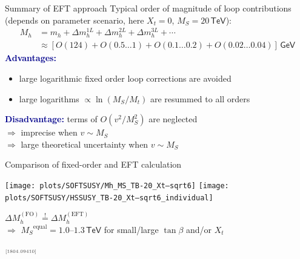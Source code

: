 \documentclass[hyperref={pdfpagelabels=false},ngerman]{beamer}
\newcommand{\eh}[1]{\,\mathsf{#1}}
\newcommand{\MS}{\ensuremath{M_S}}
\newcommand{\mycite}[1]{\ensuremath{\text{\textcolor{darkgray}{\tiny [#1]}}}}
\renewcommand{\emph}[1]{\textbf{\textcolor{darkblue}{#1}}}
\newcommand{\TeV}{\eh{TeV}}
\newcommand{\DMhFO}{\ensuremath{\Delta M_h^{(\text{FO})}}}
\newcommand{\DMhEFT}{\ensuremath{\Delta M_h^{(\text{EFT})}}}
\begin{document}
\begin{frame}{Summary of EFT approach}
  Typical order of magnitude of loop contributions (depends on
  parameter scenario, here $X_t = 0$, $\MS = 20\eh{TeV}$):
  \begin{align*}
    M_h &= m_h + \Delta m_h^{1L} + \Delta m_h^{2L} + \Delta m_h^{3L} + \cdots \\
    &\approx [O(124) + O(0.5\ldots 1) + O(0.1\ldots 0.2) + O(0.02\ldots 0.04)] \eh{GeV}
  \end{align*}
  \emph{Advantages:}
  \begin{itemize}
  \item large logarithmic fixed order loop corrections are avoided
  \item large logarithms $\propto\ln(M_S/M_t)$ are resummed to all orders
  \end{itemize}
  \emph{Disadvantage:} terms of $O(v^2/M_S^2)$ are neglected \\
  $\Rightarrow$ imprecise when $v \sim \MS$ \\
  $\Rightarrow$ large theoretical uncertainty when $v \sim \MS$
\end{frame}

\begin{frame}{Comparison of fixed-order and EFT calculation}
  \begin{center}
    \texttt{[image: plots/SOFTSUSY/Mh\_MS\_TB-20\_Xt--sqrt6]}\hfill
    \texttt{[image: plots/SOFTSUSY/HSSUSY\_TB-20\_Xt--sqrt6\_individual]}
  \end{center}
  \begin{center}
    $\DMhFO \overset{!}{=} \DMhEFT$\\[0.5em]
    $\Rightarrow$ $\MS^{\text{equal}} = 1.0$--$1.3\TeV$ for
    small/large $\tan\beta$ and/or $X_t$
  \end{center}
  \mycite{1804.09410}
\end{frame}
\end{document}
